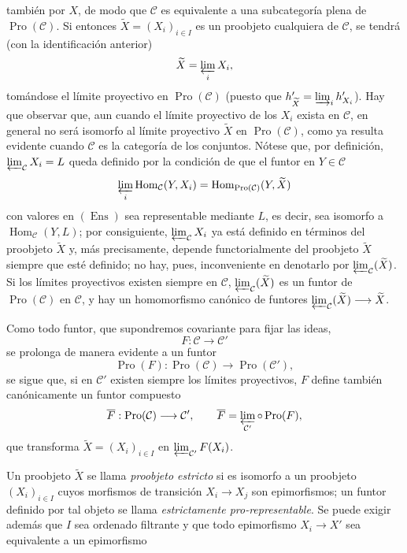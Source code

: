 \documentclass[11pt,twoside,openany]{book}
\numberwithin{equation}{section}
\newcommand{\src}[1]{%
  \phantomsection\hypertarget{src:#1}{}%
  \marginpar{\raggedleft\footnotesize\sffamily #1}%
}
\theoremstyle{plain}
\theoremstyle{definition}
\theoremstyle{remark}
\newcommand{\FgaUnitKey}{frontmatter}
\renewcommand{\src}[1]{%
  \phantomsection\hypertarget{src:\FgaUnitKey:#1}{}%
  \marginpar{\raggedleft\footnotesize\sffamily #1}%
}
\theoremstyle{plain}
\theoremstyle{definition}
\theoremstyle{remark}
\begin{document}
\src{372}
también por $X$, de modo que $\mathcal C$ es equivalente a una subcategoría
plena de $\operatorname{Pro}(\mathcal C)$. Si entonces
$\widetilde X=(X_i)_{i\in I}$ es un proobjeto cualquiera de $\mathcal C$, se
tendrá (con la identificación anterior)
\[
  \widetilde X=\varprojlim_i X_i,
\]
tomándose el límite proyectivo en $\operatorname{Pro}(\mathcal C)$
(puesto que $h'_{\widetilde X}=\varinjlim_i h'_{X_i}$). Hay que observar que,
aun cuando el límite proyectivo de los $X_i$ exista en $\mathcal C$, en
general no será isomorfo al límite proyectivo $\widetilde X$ en
$\operatorname{Pro}(\mathcal C)$, como ya resulta evidente cuando $\mathcal C$
es la categoría de los conjuntos. Nótese que, por definición,
$\varprojlim_{\mathcal C}X_i=L$ queda definido por la condición de que el
funtor en $Y\in\mathcal C$
\[
  \varprojlim_i\operatorname{Hom}_{\mathcal C}(Y,X_i)
  =\operatorname{Hom}_{\operatorname{Pro}(\mathcal C)}(Y,\widetilde X)
\]
con valores en $(\operatorname{Ens})$ sea representable mediante $L$, es decir,
sea isomorfo a $\operatorname{Hom}_{\mathcal C}(Y,L)$; por consiguiente,
$\varprojlim_{\mathcal C}X_i$ ya está definido en términos del proobjeto
$\widetilde X$ y, más precisamente, depende functorialmente del proobjeto
$\widetilde X$ siempre que esté definido; no hay, pues, inconveniente en
denotarlo por $\varprojlim_{\mathcal C}(\widetilde X)$. Si los límites
proyectivos existen siempre en $\mathcal C$,
$\varprojlim_{\mathcal C}(\widetilde X)$ es un funtor de
$\operatorname{Pro}(\mathcal C)$ en $\mathcal C$, y hay un homomorfismo
canónico de funtores
$\varprojlim_{\mathcal C}(\widetilde X)\longrightarrow\widetilde X$.

Como todo funtor, que supondremos covariante para fijar las ideas,
\[
  F:\mathcal C\longrightarrow\mathcal C'
\]
se prolonga de manera evidente a un funtor
\[
  \operatorname{Pro}(F):\operatorname{Pro}(\mathcal C)
  \longrightarrow\operatorname{Pro}(\mathcal C'),
\]
se sigue que, si en $\mathcal C'$ existen siempre los límites proyectivos, $F$
define también canónicamente un funtor compuesto
\[
  \overline F:\operatorname{Pro}(\mathcal C)\longrightarrow\mathcal C',
  \qquad
  \overline F=\varprojlim_{\mathcal C'}\circ\operatorname{Pro}(F),
\]
que transforma $\widetilde X=(X_i)_{i\in I}$ en
$\varprojlim_{\mathcal C'}F(X_i)$.

Un proobjeto $\widetilde X$ se llama \emph{proobjeto estricto} si es isomorfo a
un proobjeto $(X_i)_{i\in I}$ cuyos morfismos de transición
$X_i\longrightarrow X_j$ son epimorfismos; un funtor definido por tal objeto se
llama \emph{estrictamente pro-representable}. Se puede exigir además que $I$
sea ordenado filtrante y que todo epimorfismo $X_i\longrightarrow X'$ sea
equivalente a un epimorfismo
\end{document}
